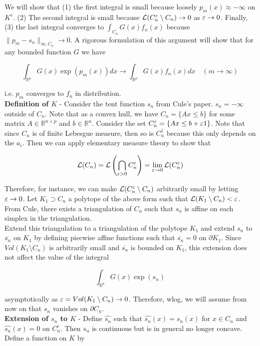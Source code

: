 \documentclass[11pt,reqno]{amsart}
\numberwithin{equation}{section}
\newcommand{\lft}{\left(}
\newcommand{\rt}{\right)}
\newcommand{\mr}{\mathbb{R}}
\newcommand{\tb}{\textbf}
\newcommand{\wh}{\widehat}
\newcommand{\mc}{\mathcal}
\newcommand{\pa}{\partial}
\begin{document}
We will show that (1) the first integral is small because loosely $p_m(x) \approx - \infty$ on $K^c$.  (2) The second integral is small because $\mc{L}(C_n^{\eps} \setminus C_n) \to 0$ as $\varepsilon \rightarrow 0$. Finally, (3) the last integral converges to $\int_{C_n} G(x) f_n(x)$ because $\|p_m - s_n\|_{\infty,C_n} \to 0$. A rigorous formulation of this argument will show that for any bounded function $G$ we have 

\[
\int_{\mr^p} G(x) \exp(p_m(x)) dx \to \int_{\mr^p} G(x) f_n(x) dx \quad (m \to \infty) 
\]

i.e. $p_m$ converges to $f_n$ in distribution. \\

\tb{Definition of $K$} - Consider the tent function $s_n$ from Cule's paper. $s_n = -\infty$ outside of $C_n$. Note that as a convex hull, we have $C_n = \{Ax \leq b\}$ for some matrix $A \in \mr^{n \times p}$ and $b \in \mr^n$. Consider the set $C_n^{\varepsilon} = \{Ax \leq b + \varepsilon 1\}$. Note that since $C_n$ is of finite Lebesgue measure, then so is $C_n^1$ because this only depends on the $a_i$. Then we can apply elementary measure theory to show that 

\[
\mc{L}(C_n) = \mc{L} \lft \bigcap_{\eps > 0} C_n^{\eps} \rt = \lim_{\eps \to 0} \mc{L}(C_n^{\eps})
\]

Therefore, for instance, we can make $\mc{L}(C_n^{\eps} \setminus C_n)$ arbitrarily small by letting $\varepsilon \rightarrow 0$. Let $K_1 \supset C_n$ a polytope of the above form such that $\mc{L}(K_1 \setminus C_n) < \eps$. From Cule, there exists a triangulation of $C_n$ such that $s_n$ is affine on each simplex in the triangulation. \\

Extend this triangulation to a triangulation of the polytope $K_1$ and extend $s_n$ to $\overline{s_n}$ on $K_1$ by defining piecwise affine functions such that $\overline{s_n} = 0$ on $\pa K_1$. Since $Vol(K_1 \setminus C_n)$ is arbitrarily small and $\overline{s_n}$ is bounded on $K_1$, this extension does not affect the value of the integral 

\[
\int_{\mr^p} G(x) \exp(s_n) 
\]

asymptotically as $\varepsilon = Vol(K_1 \setminus C_n) \rightarrow 0$. Therefore, wlog, we will assume from now on that $s_n$ vanishes on $\pa C_n$. \\

\tb{Extension of $s_n$ to $K$} - Define $\wh{s_n}$ such that $\wh{s_n}(x) = s_n(x)$ for $x \in C_n$ and $\wh{s_n}(x) = 0$ on $C_n^c$. Then $s_n$ is continuous but is in general no longer concave. Define a function on $K$ by 
\end{document}
